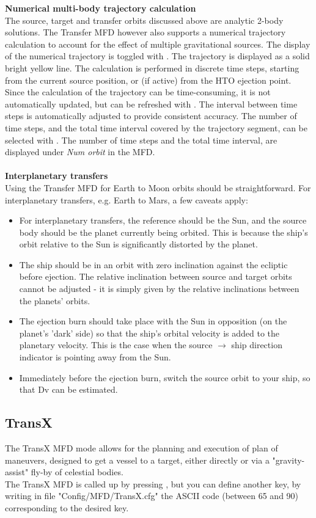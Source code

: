 \documentclass[Orbiter User Manual.tex]{subfiles}
\begin{document}
\textbf{Numerical multi-body trajectory calculation}\\
The source, target and transfer orbits discussed above are analytic 2-body solutions. The Transfer MFD however also supports a numerical trajectory calculation to account for the effect of multiple gravitational sources. The display of the numerical trajectory is toggled with \Shift{}. The trajectory is displayed as a solid bright yellow line. The calculation is performed in discrete time steps, starting from the current source position, or (if active) from the HTO ejection point. Since the calculation of the trajectory can be time-consuming, it is not automatically updated, but can be refreshed with \Shift{}. The interval between time steps is automatically adjusted to provide consistent accuracy. The number of time steps, and the total time interval covered by the trajectory segment, can be selected with \Shift{}. The number of time steps and the total time interval, are displayed under \textit{Num orbit} in the MFD.\\
\\
\textbf{Interplanetary transfers}\\
Using the Transfer MFD for Earth to Moon orbits should be straightforward. For interplanetary transfers, e.g. Earth to Mars, a few caveats apply:
\begin{itemize}
\item For interplanetary transfers, the reference should be the Sun, and the source body should be the planet currently being orbited. This is because the ship's orbit relative to the Sun is significantly distorted by the planet.
\item The ship should be in an orbit with zero inclination against the ecliptic before ejection. The relative inclination between source and target orbits cannot be adjusted - it is simply given by the relative inclinations between the planets' orbits.
\item The ejection burn should take place with the Sun in opposition (on the planet's 'dark' side) so that the ship's orbital velocity is added to the planetary velocity. This is the case when the source $\rightarrow$ ship direction indicator is pointing away from the Sun.
\item Immediately before the ejection burn, switch the source orbit to your ship, so that Dv can be estimated.
\end{itemize}



\subsection{TransX}
\label{ssec:mfd_transx}
The TransX MFD mode allows for the planning and execution of plan of maneuvers, designed to get a vessel to a target, either directly or via a "gravity-assist" fly-by of celestial bodies.\\
The TransX MFD is called up by pressing \Shift{}, but you can define another key, by writing in file "Config/MFD/TransX.cfg" the ASCII code (between 65 and 90) corresponding to the desired key.\\
\end{document}
